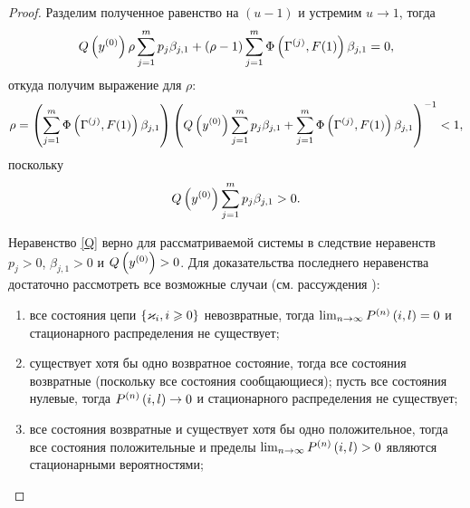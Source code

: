 \documentclass[a4paper,14pt,russian]{article}
\newcommand{\Pn}[3]{P^{(#1)} \br{#2,#3}}
\newcommand{\Gr}[1]{\Gamma^{(#1)}}
\newcommand{\Markk}[0]{\brrr{ \vk_i, i \geqslant 0}}
\begin{document}
\begin{proof}
Разделим полученное равенство на $(u-1)$ и устремим $u \to 1$, тогда
$$
 Q\br{y^{(0)}}\rho \sum_{j=1}^m p_j \beta_{j,1}  + (\rho - 1)\sum_{j=1}^m \Phi \br{\Gr{j}, F(1)} \beta_{j,1} = 0,
$$
откуда получим выражение для $\rho$:
$$
\rho = \br{\sum_{j=1}^m \Phi \br{\Gr{j}, F(1)} \beta_{j,1}} \br{ Q\br{y^{(0)}} \sum_{j=1}^m p_j \beta_{j,1} +\sum_{j=1}^m \Phi \br{\Gr{j}, F(1)} \beta_{j,1} }^{-1} < 1,
$$
поскольку 
\begin{equation}
Q\left(y^{(0)}\right) \sum_{j=1}^m p_j \beta_{j,1} > 0.
\label{Q}
\end{equation}

Неравенство \eqref{Q} верно для рассматриваемой системы в следствие неравенств $p_j > 0$, $\beta_{j,1} > 0$ и $Q\left(y^{(0)}\right)>0$. Для доказательства последнего неравенства достаточно рассмотреть все возможные случаи (см. рассуждения \cite[гл. $3$ пар. 3-4]{Shiryaev}):
\begin{enumerate}
\item все состояния цепи $\Markk$ невозвратные, тогда $\lim_{n \to \infty}\Pn{n}{i}{l} = 0$ и стационарного распределения не существует;
\item существует хотя бы одно возвратное состояние, тогда все состояния возвратные (поскольку все состояния сообщающиеся); пусть все состояния нулевые, тогда $\Pn{n}{i}{l} \to 0$ и стационарного распределения не существует;
\item все состояния возвратные и существует хотя бы одно положительное, тогда все состояния положительные и пределы $\lim_{n \to \infty}\Pn{n}{i}{l} >0$ являются стационарными вероятностями;
\end{enumerate}
\end{proof}

\end{document}
